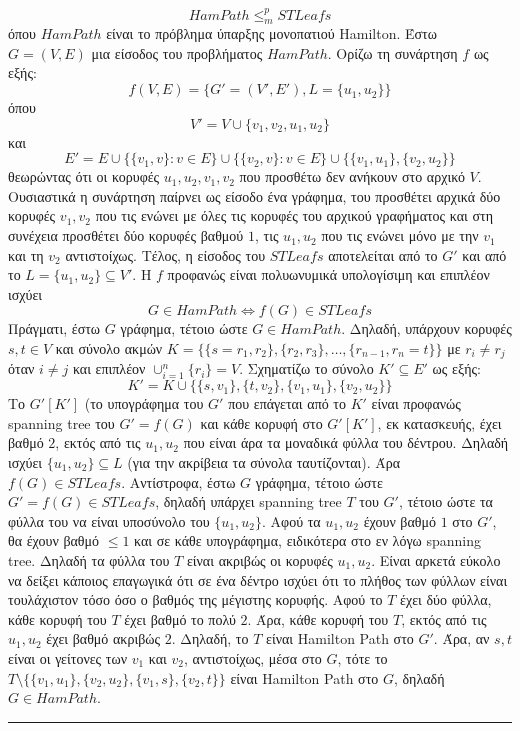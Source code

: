 \documentclass[12pt]{article}
\newcommand\en[1]{\latintext #1\greektext}
\newcommand{\HRule}{\rule{\linewidth}{0.1mm}}
\begin{document}
$$HamPath\leq_m^pSTLeafs$$
όπου $HamPath$ είναι το πρόβλημα ύπαρξης μονοπατιού \en{Hamilton}. Έστω $G=(V,E)$ μια είσοδος του προβλήματος $HamPath$. Ορίζω τη συνάρτηση $f$ ως εξής:
$$f(V,E)=\{G'=(V',E'),L=\{u_1,u_2\}\}$$
όπου
$$V'=V\cup\{v_1,v_2,u_1,u_2\}$$
και
$$E'=E\cup\{\{v_1,v\}:v\in E\}\cup\{\{v_2,v\}:v\in E\}\cup\{\{v_1,u_1\},\{v_2,u_2\}\}$$
θεωρώντας ότι οι κορυφές $u_1,u_2,v_1,v_2$ που προσθέτω δεν ανήκουν στο αρχικό $V$. Ουσιαστικά η συνάρτηση παίρνει ως είσοδο ένα γράφημα, του προσθέτει αρχικά δύο κορυφές $v_1,v_2$ που τις ενώνει με όλες τις κορυφές του αρχικού γραφήματος και στη συνέχεια προσθέτει δύο κορυφές βαθμού $1$, τις $u_1,u_2$ που τις ενώνει μόνο με την $v_1$ και τη $v_2$ αντιστοίχως. Τέλος, η είσοδος του $STLeafs$ αποτελείται από το $G'$ και από το $L=\{u_1,u_2\}\subseteq V'$. Η $f$ προφανώς είναι πολυωνυμικά υπολογίσιμη και επιπλέον ισχύει
$$G\in HamPath\Leftrightarrow f(G)\in STLeafs$$
Πράγματι, έστω $G$ γράφημα, τέτοιο ώστε $G\in HamPath$. Δηλαδή, υπάρχουν κορυφές $s,t\in V$ και σύνολο ακμών $Κ=\{\{s=r_1,r_2\},\{r_2,r_3\},\ldots,\{r_{n-1},r_n=t\}\}$ με $r_i\neq r_j$ όταν $i\neq j$ και επιπλέον $\cup_{i=1}^n\{r_i\}=V$. Σχηματίζω το σύνολο $K'\subseteq E'$ ως εξής:
$$K'=K\cup\{\{s,v_1\},\{t,v_2\},\{v_1,u_1\},\{v_2,u_2\}\}$$
Το $G'[K']$ (το υπογράφημα του $G'$ που επάγεται από το $K'$ είναι προφανώς \en{spanning tree} του $G'=f(G)$ και κάθε κορυφή στο $G'[K']$, εκ κατασκευής, έχει βαθμό $2$, εκτός από τις $u_1,u_2$ που είναι άρα τα μοναδικά φύλλα του δέντρου. Δηλαδή ισχύει $\{u_1,u_2\}\subseteq L$ (για την ακρίβεια τα σύνολα ταυτίζονται). Άρα $f(G)\in STLeafs$. Αντίστροφα, έστω $G$ γράφημα, τέτοιο ώστε $G'=f(G)\in STLeafs$, δηλαδή υπάρχει \en{spanning tree} $T$ του $G'$, τέτοιο ώστε τα φύλλα του να είναι υποσύνολο του $\{u_1,u_2\}$. Αφού τα $u_1,u_2$ έχουν βαθμό $1$ στο $G'$, θα έχουν βαθμό $\leq1$ και σε κάθε υπογράφημα, ειδικότερα στο εν λόγω \en{spanning tree}. Δηλαδή τα φύλλα του $T$ είναι ακριβώς οι κορυφές $u_1,u_2$. Είναι αρκετά εύκολο να δείξει κάποιος επαγωγικά ότι σε ένα δέντρο ισχύει ότι το πλήθος των φύλλων είναι τουλάχιστον τόσο όσο ο βαθμός της μέγιστης κορυφής. Αφού το $T$ έχει δύο φύλλα, κάθε κορυφή του $T$ έχει βαθμό το πολύ $2$. Άρα, κάθε κορυφή του $T$, εκτός από τις $u_1,u_2$ έχει βαθμό ακριβώς $2$. Δηλαδή, το $T$ είναι \en{Hamilton Path} στο $G'$. Άρα, αν $s,t$ είναι οι γείτονες των $v_1$ και $v_2$, αντιστοίχως, μέσα στο $G$, τότε το $T\setminus\{\{v_1,u_1\},\{v_2,u_2\},\{v_1,s\},\{v_2,t\}\}$ είναι \en{Hamilton Path} στο $G$, δηλαδή $G\in HamPath$.\\\HRule\\
\end{document}
